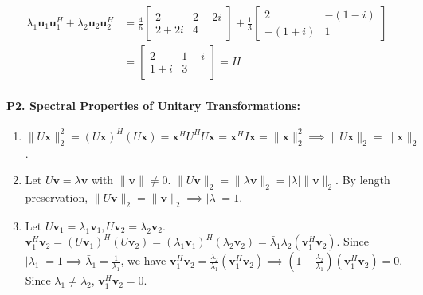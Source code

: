 \begin{enumerate}[label=(\alph*)]
    \begin{align*}
    \lambda_1 \mathbf{u}_1 \mathbf{u}_1^H + \lambda_2 \mathbf{u}_2 \mathbf{u}_2^H &= \frac{4}{6}\begin{bmatrix} 2 & 2-2i \\ 2+2i & 4 \end{bmatrix} + \frac{1}{3}\begin{bmatrix} 2 & -(1-i) \\ -(1+i) & 1 \end{bmatrix} \\
    &= \begin{bmatrix} 2 & 1-i \\ 1+i & 3 \end{bmatrix} = H
    \end{align*}
\end{enumerate}

\paragraph{P2. Spectral Properties of Unitary Transformations:}
\begin{enumerate}[label=(\alph*)]
    \item $\|U\mathbf{x}\|_2^2 = (U\mathbf{x})^H (U\mathbf{x}) = \mathbf{x}^H U^H U \mathbf{x} = \mathbf{x}^H I \mathbf{x} = \|\mathbf{x}\|_2^2 \implies \|U\mathbf{x}\|_2 = \|\mathbf{x}\|_2$.
    \item Let $U\mathbf{v} = \lambda \mathbf{v}$ with $\|\mathbf{v}\| \ne 0$. $\|U\mathbf{v}\|_2 = \|\lambda \mathbf{v}\|_2 = |\lambda| \|\mathbf{v}\|_2$. By length preservation, $\|U\mathbf{v}\|_2 = \|\mathbf{v}\|_2 \implies |\lambda| = 1$.
    \item Let $U\mathbf{v}_1 = \lambda_1 \mathbf{v}_1, U\mathbf{v}_2 = \lambda_2 \mathbf{v}_2$.
    $\mathbf{v}_1^H \mathbf{v}_2 = (U\mathbf{v}_1)^H (U\mathbf{v}_2) = (\lambda_1 \mathbf{v}_1)^H (\lambda_2 \mathbf{v}_2) = \bar{\lambda}_1 \lambda_2 (\mathbf{v}_1^H \mathbf{v}_2)$.
    Since $|\lambda_1| = 1 \implies \bar{\lambda}_1 = \frac{1}{\lambda_1}$, we have $\mathbf{v}_1^H \mathbf{v}_2 = \frac{\lambda_2}{\lambda_1}(\mathbf{v}_1^H \mathbf{v}_2) \implies \left(1 - \frac{\lambda_2}{\lambda_1}\right)(\mathbf{v}_1^H \mathbf{v}_2) = 0$. Since $\lambda_1 \ne \lambda_2$, $\mathbf{v}_1^H \mathbf{v}_2 = 0$.
\end{enumerate}

